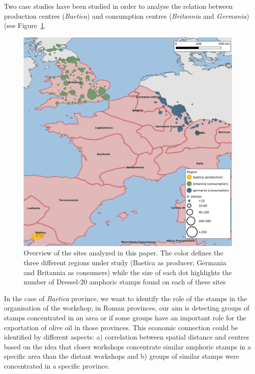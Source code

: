 \documentclass[review]{elsarticle}
\begin{document}
Two case studies have been studied in order to analyse the relation between production centres (\textit{Baetica}) and consumption centres (\textit{Britannia} and \textit{Germania}) (see Figure~\ref{general}.

\begin{figure}[htp]
	\centering
\includegraphics[width=\linewidth]{figs/general_map}
\caption{Overview of the sites analyzed in this paper. The color defines the three different regions under study (Baetica as producer; Germania and Britannia as consumers) while the size of each dot highlights the number of Dressel-20 amphoric stamps found on each of these sites}

\label{general}
\end{figure} 
        
In the case of \textit{Baetica} province, we want to identify the role of the stamps in the organisation of the workshop; in Roman provinces, our aim is detecting groups of stamps concentrated in an area or if some groups have an important role for the exportation of olive oil in those provinces. This economic connection could be identified by different aspects: a) correlation between spatial distance and centres based on the idea that closer workshops concentrate similar amphoric stamps in a specific area than the distant workshops and b) groups of similar stamps were concentrated in a specific province. 
\end{document}
